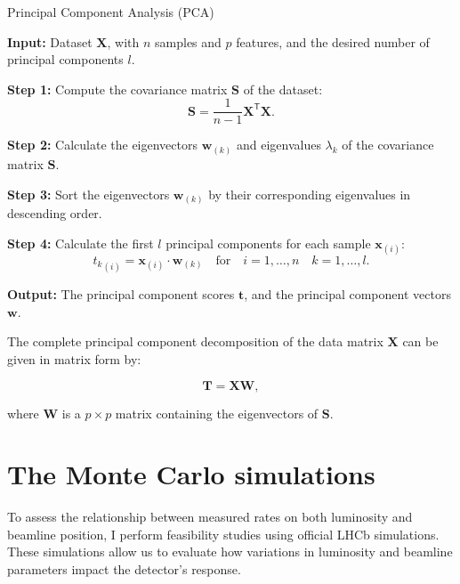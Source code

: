 \begin{algorithm}
\caption{Principal Component Analysis (PCA)}
\begin{algorithmic}[1]
    \STATE \textbf{Input:} Dataset \(\mathbf{X}\), with \(n\) samples and \(p\) features, and the desired number of principal components \(l\).

    \STATE \textbf{Step 1:} Compute the covariance matrix \(\mathbf{S}\) of the dataset:
    \begin{equation*}
    \mathbf{S} = \frac{1}{n - 1} \mathbf{X}^{\mathsf{T}} \mathbf{X}.
    \end{equation*}

    \STATE \textbf{Step 2:} Calculate the eigenvectors \(\mathbf{w}_{(k)}\) and eigenvalues \(\lambda_k\) of the covariance matrix \(\mathbf{S}\).

    \STATE \textbf{Step 3:} Sort the eigenvectors \(\mathbf{w}_{(k)}\) by their corresponding eigenvalues in descending order.

    \STATE \textbf{Step 4:} Calculate the first \(l\) principal components for each sample \(\mathbf{x}_{(i)}\):
    \begin{equation*}
    {t_{k}}_{(i)} = \mathbf{x}_{(i)} \cdot \mathbf{w}_{(k)} \quad \text{for} \quad i = 1, \ldots, n \quad k = 1, \ldots, l.
    \end{equation*}
    
    \STATE \textbf{Output:} The principal component scores \(\mathbf{t}\), and the principal component vectors \(\mathbf{w}\).
\end{algorithmic}
\end{algorithm}


The complete principal component decomposition of the data matrix $\mathbf{X}$ can be given in matrix form by:

\begin{equation}
\mathbf{T} = \mathbf{X} \mathbf{W},
\end{equation}

where $\mathbf{W}$ is a $p \times p$ matrix containing the eigenvectors of $\mathbf{S}$.



\section{The Monte Carlo simulations}
To assess the relationship between measured rates on both luminosity and beamline position, I perform feasibility studies using official LHCb simulations. These simulations allow us to evaluate how variations in luminosity and beamline parameters impact the detector's response.

